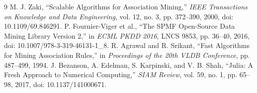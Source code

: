 \documentclass[conference,a4paper]{IEEEtran}
\renewcommand{\refname}{Tài liệu tham khảo}
\begin{document}
\renewcommand{\refname}{Tài liệu tham khảo}
\raggedbottom

\begin{thebibliography}{9}
 M. J. Zaki, ``Scalable Algorithms for Association Mining,'' \emph{IEEE Transactions on Knowledge and Data Engineering}, vol. 12, no. 3, pp. 372--390, 2000, doi: 10.1109/69.846291.
 P. Fournier-Viger et al., ``The SPMF Open-Source Data Mining Library Version 2,'' in \emph{ECML PKDD 2016}, LNCS 9853, pp. 36--40, 2016, doi: 10.1007/978-3-319-46131-1\_8.
 R. Agrawal and R. Srikant, ``Fast Algorithms for Mining Association Rules,'' in \emph{Proceedings of the 20th VLDB Conference}, pp. 487--499, 1994.
 J. Bezanson, A. Edelman, S. Karpinski, and V. B. Shah, ``Julia: A Fresh Approach to Numerical Computing,'' \emph{SIAM Review}, vol. 59, no. 1, pp. 65--98, 2017, doi: 10.1137/141000671.
\end{thebibliography}
\end{document}
